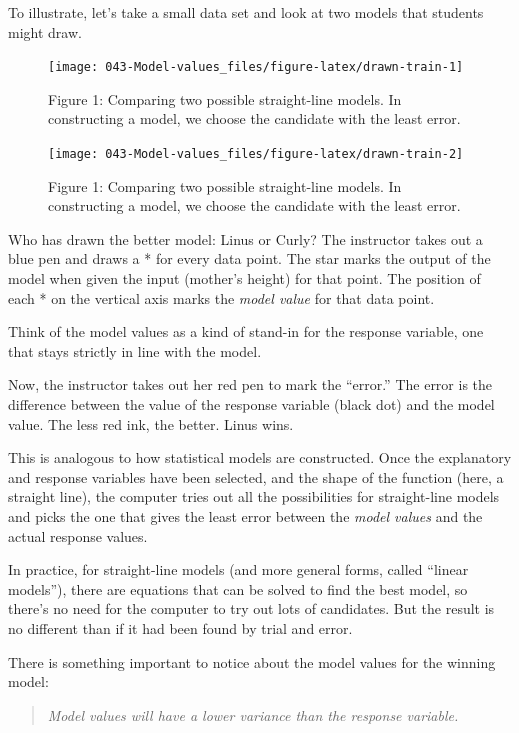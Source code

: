 \documentclass[]{book}
\begin{document}
To illustrate, let's take a small data set and look at two models that students might draw.



\begin{figure}\texttt{[image: 043-Model-values\_files/figure-latex/drawn-train-1]} \caption{Figure 1: Comparing two possible straight-line models. In constructing a model, we choose the candidate with the least error.}\label{fig:drawn-train}
\end{figure}
\begin{figure}\texttt{[image: 043-Model-values\_files/figure-latex/drawn-train-2]} \caption{Figure 1: Comparing two possible straight-line models. In constructing a model, we choose the candidate with the least error.}\label{fig:drawn-train}
\end{figure}

Who has drawn the better model: Linus or Curly? The instructor takes out a blue pen and draws a * for every data point. The star marks the output of the model when given the input (mother's height) for that point. The position of each * on the vertical axis marks the \emph{model value} for that data point.

Think of the model values as a kind of stand-in for the response variable, one that stays strictly in line with the model.

Now, the instructor takes out her red pen to mark the ``error.'' The error is the difference between the value of the response variable (black dot) and the model value. The less red ink, the better. Linus wins.

This is analogous to how statistical models are constructed. Once the explanatory and response variables have been selected, and the shape of the function (here, a straight line), the computer tries out all the possibilities for straight-line models and picks the one that gives the least error between the \emph{model values} and the actual response values.

In practice, for straight-line models (and more general forms, called ``linear models''), there are equations that can be solved to find the best model, so there's no need for the computer to try out lots of candidates. But the result is no different than if it had been found by trial and error.

There is something important to notice about the model values for the winning model:

\begin{quote}
\emph{Model values will have a lower variance than the response variable.}
\end{quote}
\end{document}
